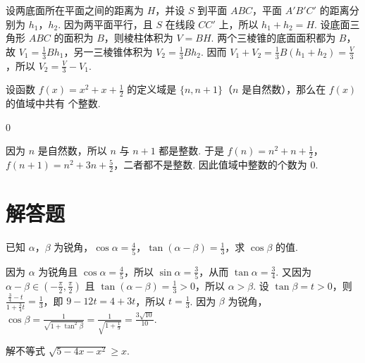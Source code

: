 \documentclass[UTF8,a4paper,oneside,11pt]{ctexbook}
\begin{document}
\begin{solution}
设两底面所在平面之间的距离为 \(H\)，并设 \(S\) 到平面 \(ABC\)，平面 \(A'B'C'\) 的距离分别为 \(h_1\)，\(h_2\). 因为两平面平行，且 \(S\) 在线段 \(CC'\) 上，所以 \(h_1+h_2=H\). 设底面三角形 \(ABC\) 的面积为 \(B\)，则棱柱体积为 \(V=BH\). 两个三棱锥的底面面积都为 \(B\)，故 \(V_1=\frac{1}{3}Bh_1\)，另一三棱锥体积为 \(V_2=\frac{1}{3}Bh_2\). 因而 \(V_1+V_2=\frac{1}{3}B(h_1+h_2)=\frac{V}{3}\)，所以 \(V_2=\frac{V}{3}-V_1\).
\end{solution}

\begin{problem}
设函数 \(f(x)=x^2+x+\frac{1}{2}\) 的定义域是 \(\{n,n+1\}\)（\(n\) 是自然数），那么在 \(f(x)\) 的值域中共有\fillinblank{} 个整数.
\end{problem}

\begin{answer}
\(0\)
\end{answer}

\begin{solution}
因为 \(n\) 是自然数，所以 \(n\) 与 \(n+1\) 都是整数. 于是 \(f(n)=n^2+n+\frac{1}{2}\)，\(f(n+1)=n^2+3n+\frac{5}{2}\)，二者都不是整数. 因此值域中整数的个数为 \(0\).
\end{solution}

\section{解答题}

\begin{problem}
已知 \(\alpha\)，\(\beta\) 为锐角，\(\cos \alpha=\frac{4}{5}\)，\(\tan(\alpha-\beta)=\frac{1}{3}\)，求 \(\cos \beta\) 的值.
\end{problem}

\begin{solution}
因为 \(\alpha\) 为锐角且 \(\cos\alpha=\frac{4}{5}\)，所以 \(\sin\alpha=\frac{3}{5}\)，从而 \(\tan\alpha=\frac{3}{4}\). 又因为 \(\alpha-\beta\in\left(-\frac{\pi}{2},\frac{\pi}{2}\right)\) 且 \(\tan(\alpha-\beta)=\frac{1}{3}>0\)，所以 \(\alpha>\beta\). 设 \(\tan\beta=t>0\)，则
\(\frac{\frac{3}{4}-t}{1+\frac{3}{4}t}=\frac{1}{3}\)，即 \(9-12t=4+3t\)，所以 \(t=\frac{1}{3}\). 因为 \(\beta\) 为锐角，\(\cos\beta=\frac{1}{\sqrt{1+\tan^2\beta}}=\frac{1}{\sqrt{1+\frac{1}{9}}}=\frac{3\sqrt{10}}{10}\).
\end{solution}

\begin{problem}
解不等式 \(\sqrt{5-4x-x^2}\geqslant x\).
\end{problem}
\end{document}
